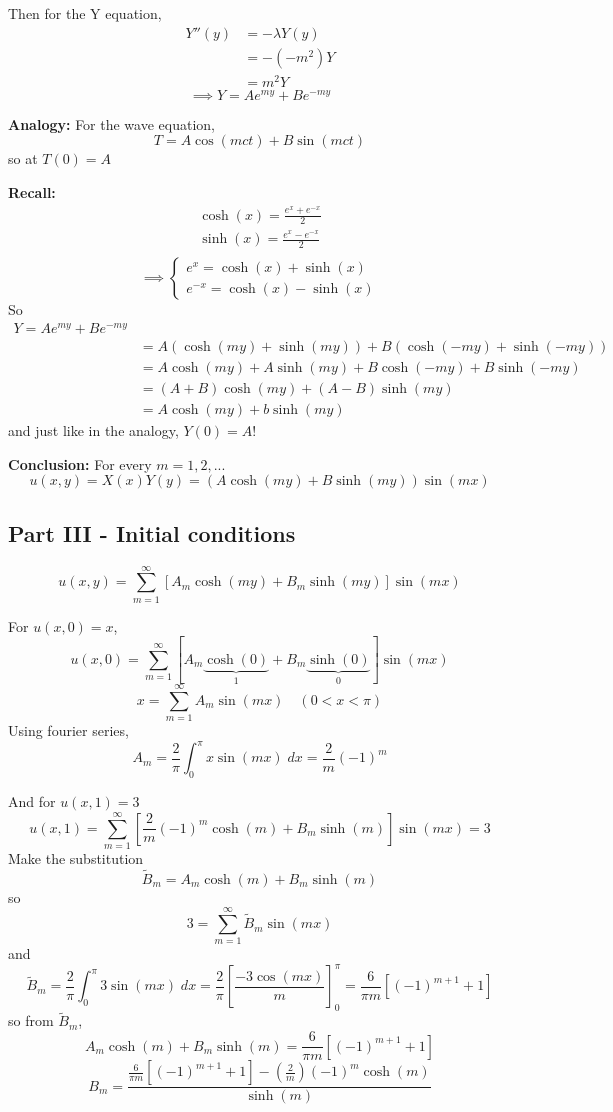 \documentclass[12pt]{article}
\begin{document}
Then for the Y equation, 
\begin{align*}
    Y''(y) &= -\lambda Y(y)\\
    &= -(-m^2)Y\\
    &= m^2 Y
\end{align*}
\[\implies Y = Ae^{my} + Be^{-my}\]

\textbf{Analogy:} For the wave equation, 
\[T = A\cos(mct) + B\sin(mct)\]
so at $T(0) = A$

\textbf{Recall:}
\begin{gather*}
    \cosh(x) = \frac{e^x + e^{-x}}{2}\\
    \sinh(x) = \frac{e^x - e^{-x}}{2}\\
\end{gather*}
\[\implies \begin{cases}
    e^x = \cosh(x)+ \sinh(x)\\
    e^{-x} = \cosh(x) - \sinh(x)
\end{cases}\]
So 
\begin{align*}
    Y = Ae^{my} + Be^{-my}\\
    &= A(\cosh(my)+ \sinh(my)) + B(\cosh(-my)+ \sinh(-my))\\
    &= A\cosh(my)+ A\sinh(my) + B\cosh(-my)+ B\sinh(-my)\\
    &= (A + B) \cosh(my) + (A-B)\sinh(my)\\
    &= A\cosh(my)+ b\sinh(my)
\end{align*}
and just like in the analogy, $Y(0) = A$!

\textbf{Conclusion:}
For every $m = 1, 2, ...$ 
\[u(x, y) = X(x)Y(y) = (A\cosh(my) + B\sinh(my))\sin(mx)\]

\subsection{Part III - Initial conditions}
\[u(x, y) = \sum_{m=1}^\infty [A_m\cosh(my) + B_m\sinh(my)]\sin(mx)\]

For $u(x, 0) = x$, 
\[u(x, 0) = \sum_{m=1}^\infty [A_m \underbrace{\cosh(0)}_{1} + B_m \underbrace{\sinh(0)}_0]\sin(mx)\]
\[x = \sum_{m=1}^\infty A_m \sin(mx) \quad (0 < x < \pi)\]
Using fourier series,
\[A_m = \frac{2}{\pi}\int_0^\pi x\sin(mx)\; dx = \frac{2}{m}(-1)^m\]

And for $u(x, 1) = 3$
\[u(x, 1) = \sum_{m=1}^\infty \left[\frac{2}{m}(-1)^m\cosh(m) + B_m\sinh(m)\right]\sin(mx) = 3 \]
Make the substitution 
\[\tilde B_m = A_m \cosh(m) + B_m\sinh(m)\]
so 
\[3 = \sum_{m=1}^\infty \tilde B_m \sin(mx)\]
and 
\[\tilde B_m = \frac{2}{\pi} \int_0^\pi 3\sin(mx)\; dx = \frac{2}{\pi}\left[\frac{-3\cos(mx)}{m}\right]_0^\pi = \frac{6}{\pi m}[(-1)^{m+1} + 1]\]
so from $\tilde B_m$, 
\[A_m \cosh(m) + B_m\sinh(m) = \frac{6}{\pi m}[(-1)^{m+1} + 1]\]
\[B_m = \frac{\frac{6}{\pi m}[(-1)^{m+1} + 1] - (\frac{2}{m})(-1)^m\cosh(m)}{\sinh(m)}\]
\end{document}

